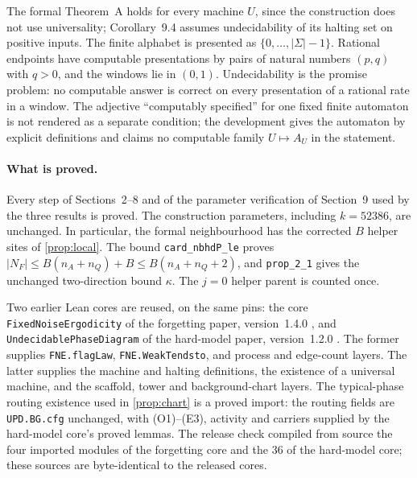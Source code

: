 The formal Theorem~A holds for every machine $U$, since the construction does not use universality; Corollary~9.4 assumes undecidability of its halting set on positive inputs. The finite alphabet is presented as $\{0,\ldots,|\Sigma|-1\}$. Rational endpoints have computable presentations by pairs of natural numbers $(p,q)$ with $q>0$, and the windows lie in $(0,1)$. Undecidability is the promise problem: no computable answer is correct on every presentation of a rational rate in a window. The adjective ``computably specified'' for one fixed finite automaton is not rendered as a separate condition; the development gives the automaton by explicit definitions and claims no computable family $U\mapsto A_U$ in the statement.

\paragraph{What is proved.} Every step of Sections~2--8 and of the parameter verification of Section~9 used by the three results is proved. The construction parameters, including $k=52386$, are unchanged. In particular, the formal neighbourhood has the corrected $B$ helper sites of \cref{prop:local}. The bound \texttt{card\_nbhdP\_le} proves $|N_F|\le B(n_A+n_Q)+B\le B(n_A+n_Q+2)$, and \texttt{prop\_2\_1} gives the unchanged two-direction bound $\kappa$. The $j=0$ helper parent is counted once.

Two earlier Lean cores are reused, on the same pins: the core \texttt{FixedNoiseErgodicity} of the forgetting paper, version~1.4.0 \cite{DMforget}, and \texttt{UndecidablePhaseDiagram} of the hard-model paper, version~1.2.0 \cite{DMhard}. The former supplies \texttt{FNE.flagLaw}, \texttt{FNE.WeakTendsto}, and process and edge-count layers. The latter supplies the machine and halting definitions, the existence of a universal machine, and the scaffold, tower and background-chart layers. The typical-phase routing existence used in \cref{prop:chart} is a proved import: the routing fields are \texttt{UPD.BG.cfg} unchanged, with (O1)--(E3), activity and carriers supplied by the hard-model core's proved lemmas. The release check compiled from source the four imported modules of the forgetting core and the 36 of the hard-model core; these sources are byte-identical to the released cores.


